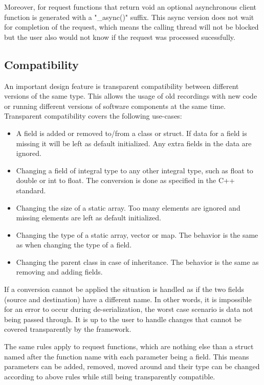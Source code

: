 \documentclass[10pt,a4paper]{report}
\begin{document}
Moreover, for request functions that return void an optional asynchronous client function is generated with a "_async()" suffix. This async version does not wait for completion of the request, which means the calling thread will not be blocked but the user also would not know if the request was processed sucessfully.

\subsection{Compatibility}
An important design feature is transparent compatibility between different versions of the same type. This allows the usage of old recordings with new code or running different versions of software components at the same time.
Transparent compatibility covers the following use-cases:
\begin{itemize}
\item A field is added or removed to/from a class or struct. If data for a field is missing it will be left as default initialized. Any extra fields in the data are ignored.
\item Changing a field of integral type to any other integral type, such as float to double or int to float. The conversion is done as specified in the C++ standard.
\item Changing the size of a static array. Too many elements are ignored and missing elements are left as default initialized.
\item Changing the type of a static array, vector or map. The behavior is the same as when changing the type of a field.
\item Changing the parent class in case of inheritance. The behavior is the same as removing and adding fields.
\end{itemize}

If a conversion cannot be applied the situation is handled as if the two fields (source and destination) have a different name. In other words, it is impossible for an error to occur during de-serialization, the worst case scenario is data not being passed through. It is up to the user to handle changes that cannot be covered transparently by the framework.

The same rules apply to request functions, which are nothing else than a struct named after the function name with each parameter being a field. This means parameters can be added, removed, moved around and their type can be changed according to above rules while still being transparently compatible.
\end{document}
